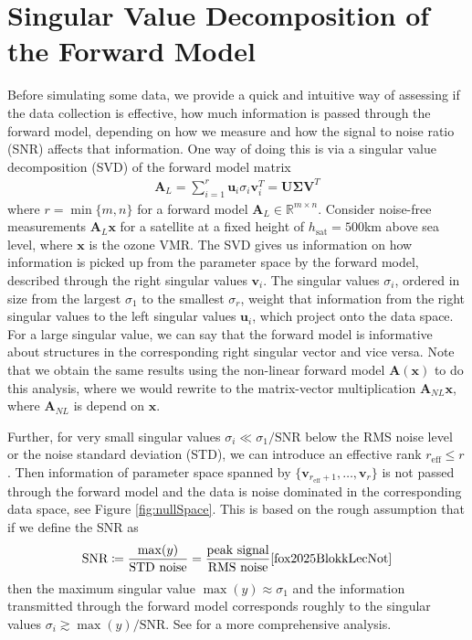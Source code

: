 \section{Singular Value Decomposition of the Forward Model}
\label{sec:SVD}
Before simulating some data, we provide a quick and intuitive way of assessing if the data collection is effective, how much information is passed through the forward model, depending on how we measure and how the signal to noise ratio (SNR) affects that information.
One way of doing this is via a singular value decomposition (SVD) of the forward model matrix
\begin{align}
	\bm{A}_L = \sum_{i =1}^{r} \bm{u}_i  \sigma_i \bm{v}^T_i = \bm{U} \bm{\Sigma} \bm{V}^T
\end{align}
where $r = \min\{m,n\}$ for a forward model $\bm{A}_L \in \mathbb{R}^{m \times n}$.
Consider noise-free measurements $\bm{A}_L\bm{x}$ for a satellite at a fixed height of $h_{\text{sat}} = 500$km above sea level, where $\bm{x}$ is the ozone VMR.
The SVD gives us information on how information is picked up from the parameter space by the forward model, described through the right singular values $\bm{v}_i$.
The singular values $\sigma_i $, ordered in size from the largest $\sigma_1$ to the smallest $\sigma_{r}$, weight that information from the right singular values to the left singular values $\bm{u}_i$, which project onto the data space.
For a large singular value, we can say that the forward model is informative about structures in the corresponding right singular vector and vice versa.
Note that we obtain the same results using the non-linear forward model $\bm{A}(\bm{x})$ to do this analysis, where we would rewrite to the matrix-vector multiplication $\bm{A}_{NL} \bm{x}$, where $\bm{A}_{NL}$ is depend on $\bm{x}$.

Further, for very small singular values $\sigma_i \ll \sigma_1/\text{SNR}$ below the RMS noise level or the noise standard deviation (STD), we can introduce an effective rank $r_{\text{eff}} \leq r$.
Then information of parameter space spanned by $ \{\bm{v}_{r_{\text{eff}} +1}, \dots ,\bm{v}_r \}$ is not passed through the forward model and the data is noise dominated in the corresponding data space, see Figure \ref{fig:nullSpace}.
This is based on the rough assumption that if we define the SNR as
\begin{align}
	\text{SNR} \coloneqq \frac{\max(y)}{\text{STD noise}} = \frac{\text{peak signal}}{\text{RMS noise}} \text{\cite{fox2025BlokkLecNot}} \label{eq:SNR}
\end{align}
then the maximum singular value $\max(y) \approx \sigma_1$ and the information transmitted through the forward model corresponds roughly to the singular values $\sigma_i \gtrsim \max(y)/ \text{SNR}$.
See \cite{tan2016LecNot} for a more comprehensive analysis.

